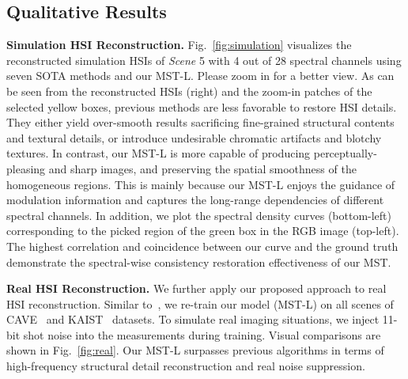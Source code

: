 \documentclass[10pt,twocolumn,letterpaper]{article}
\begin{document}
\subsection{Qualitative Results}
\vspace{-1.2mm}
\noindent\textbf{Simulation HSI Reconstruction.} Fig.~\ref{fig:simulation} visualizes the reconstructed simulation HSIs of \emph{Scene} 5 with 4 out of 28 spectral channels using seven SOTA methods and our MST-L. Please zoom in for a better view. As can be seen from the reconstructed HSIs (right) and the zoom-in patches of the selected yellow boxes, previous methods are less favorable to restore HSI details. They either yield over-smooth results sacrificing fine-grained structural contents and textural details, or introduce undesirable chromatic artifacts and blotchy textures. In contrast, our MST-L is more capable of producing perceptually-pleasing and sharp images, and preserving  the spatial smoothness of the homogeneous regions. This is mainly because our MST-L enjoys the guidance of modulation information and captures the long-range dependencies of different spectral channels. In addition, we plot the spectral density curves (bottom-left) corresponding to the picked region of the green box in the RGB image (top-left). The highest correlation and coincidence between our curve and the ground truth demonstrate the spectral-wise consistency restoration effectiveness of our MST.

\noindent\textbf{Real HSI Reconstruction.} We further apply our proposed approach to real HSI reconstruction. Similar to~\cite{tsa_net,gsm}, we re-train our model (MST-L) on all scenes of CAVE~\cite{cave} and KAIST~\cite{kaist} datasets. To simulate real imaging situations, we inject 11-bit shot noise into the measurements during training. Visual comparisons are shown in Fig.~\ref{fig:real}. Our MST-L surpasses previous algorithms in terms of high-frequency structural detail reconstruction and real noise suppression. 
\end{document}
